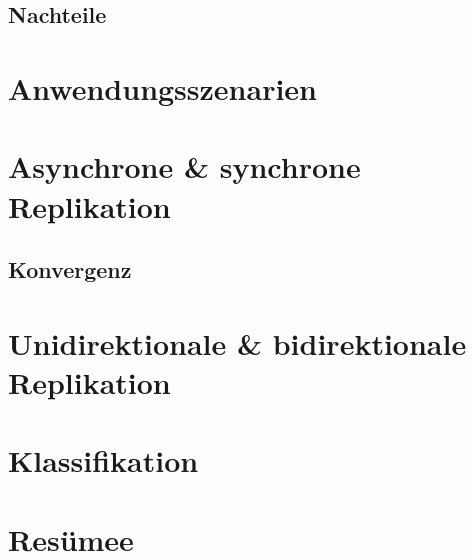\subsection{Nachteile}

\section{Anwendungsszenarien}

\section{Asynchrone \& synchrone Replikation}

\subsection{Konvergenz}

\section{Unidirektionale \& bidirektionale Replikation}

\section{Klassifikation}

\section{Resümee}